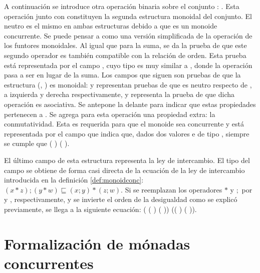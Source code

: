 A continuación se introduce otra operación binaria sobre el conjunto : . Esta operación junto con  constituyen la segunda estructura monoidal del conjunto. El neutro es el mismo en ambas estructuras debido a que es un monoide concurrente. Se puede pensar a  como una versión simplificada de la operación  de los funtores monoidales. Al igual que para la suma, se da la prueba de que este segundo operador es también compatible con la relación de orden. Esta prueba está representada por el campo , cuyo tipo es muy similar a , donde la operación pasa a ser  en lugar de la suma. Los campos que siguen son pruebas de que la estructura (, ) es monoidal:  y  representan pruebas de que  es neutro respecto de , a izquierda y derecha respectivamente, y  representa la prueba de que dicha operación es asociativa. Se antepone la  delante para indicar que estas propiedades pertenecen a . Se agrega para esta operación una propiedad extra: la conmutatividad. Esta es requerida para que el monoide sea concurrente y está representada por el campo  que indica que, dados dos valores  e  de tipo , siempre se cumple que ( )  ( ).

El último campo de esta estructura representa la ley de intercambio. El tipo del campo  se obtiene de forma casi directa de la ecuación de la ley de intercambio introducida en la definición \ref{def:monoidconc}: $(x * z) ; (y * w) \sqsubseteq (x ; y) * (z ; w)$. Si se reemplazan los operadores $*$ y $;$ por  y , respectivamente, y se invierte el orden de la desigualdad como se explicó previamente, se llega a la siguiente ecuación: ( (  ) (  ))  (( )  ( )).

\section{Formalización de mónadas concurrentes}\label{form:monconc}

